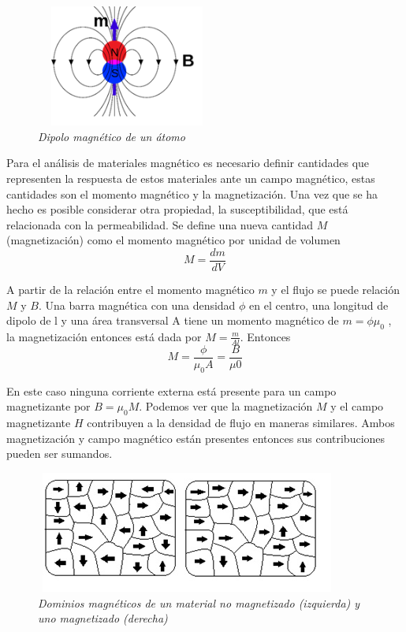 \begin{figure}[htb]
\begin{center}
\centering
	\includegraphics[width=6cm, height=4cm]{images/Capitulo_1/Dipolo_magnetico_de_un_atomo}
	\caption{\textit{Dipolo magnético de  un átomo}}
	\label{fig:system:example1}	
\end{center}
\end{figure}

Para el análisis de materiales magnético es necesario definir cantidades que representen la respuesta de estos materiales ante un campo magnético, estas cantidades son el momento magnético y la magnetización. Una vez que se ha hecho es posible considerar otra propiedad, la susceptibilidad, que está relacionada con la permeabilidad.
Se define una nueva cantidad $M$ (magnetización) como el momento magnético por unidad de volumen
\begin{equation}
	M = \frac{dm}{dV}
\end{equation}

A partir de la relación entre el momento magnético $m$ y el flujo se puede relación $M$ y $B$. Una barra magnética con una densidad $\phi$ en el centro, una longitud de dipolo de l y una área transversal A tiene un momento magnético de $m =\phi \mu_0$  , la magnetización  entonces está dada por $M = \frac{m}{Al}$. Entonces
\begin{equation}
	M = \frac{\phi}{\mu_0A} = \frac{B}{\mu 0}
\end{equation}

En este caso ninguna corriente externa está presente para un campo magnetizante por $B = \mu_0 M$. Podemos ver que la magnetización $M$ y el campo magnetizante $H$ contribuyen a la densidad de flujo en maneras similares.  Ambos magnetización y campo magnético están presentes  entonces sus contribuciones pueden ser sumandos.

\begin{figure}[htb]
\begin{center}
\centering
	\includegraphics[width=10cm, height=4cm]{images/Capitulo_1/Dominios_magneticos_de_un_material}
	\caption{\textit{Dominios magnéticos de un material no magnetizado (izquierda) y uno magnetizado (derecha)}}
	\label{fig:system:example1}	
\end{center}
\end{figure}

